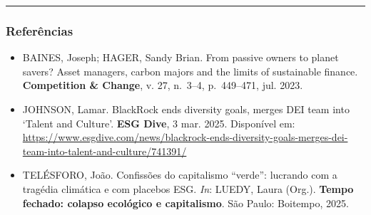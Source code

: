 \begin{center}\rule{0.5\linewidth}{0.5pt}\end{center}

\hypertarget{referuxeancias}{%
\subsubsection{Referências}\label{referuxeancias}}

\begin{itemize}
\tightlist
\item
  BAINES, Joseph; HAGER, Sandy Brian. From passive owners to planet
  savers? Asset managers, carbon majors and the limits of sustainable
  finance. \textbf{Competition & Change}, v. 27, n.~3--4, p.~449--471,
  jul. 2023.
\item
  JOHNSON, Lamar. BlackRock ends diversity goals, merges DEI team into
  `Talent and Culture'. \textbf{ESG Dive}, 3 mar. 2025. Disponível em:
  \url{https://www.esgdive.com/news/blackrock-ends-diversity-goals-merges-dei-team-into-talent-and-culture/741391/}
\item
  TELÉSFORO, João. Confissões do capitalismo ``verde'': lucrando com a
  tragédia climática e com placebos ESG. \textit{In}: LUEDY, Laura
  (Org.). \textbf{Tempo fechado: colapso ecológico e capitalismo}. São
  Paulo: Boitempo, 2025.
\end{itemize}
